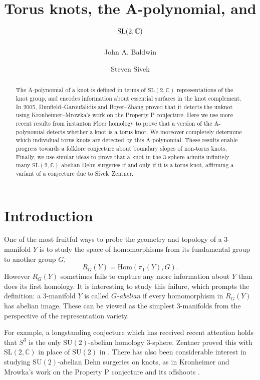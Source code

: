 \documentclass[11pt]{amsart}
\title{Torus knots, the A-polynomial, and $\SL(2,\C)$}
\author[John A. Baldwin]{John A. Baldwin}
\author[Steven Sivek]{Steven Sivek}
\numberwithin{equation}{section}
\numberwithin{theorem}{section}
\theoremstyle{definition}
\newcommand{\C}{\mathbb{C}}
\newcommand\SU{\mathrm{SU}}
\newcommand\SL{\mathrm{SL}}
\begin{document}

\begin{abstract}
The A-polynomial of a knot is defined in terms of $\SL(2,\C)$ representations of the knot group, and encodes information about essential surfaces in the knot complement. In 2005, Dunfield--Garoufalidis and Boyer--Zhang proved that it detects the unknot using Kronheimer--Mrowka's work on the Property P conjecture. Here we use more recent results from instanton Floer homology to prove that a version of the A-polynomial detects whether a knot is a torus knot. We moreover completely determine which individual torus knots are detected by this A-polynomial.  These results enable progress towards a folklore conjecture about boundary slopes of non-torus knots.  Finally, we use similar ideas to prove that a knot in the 3-sphere admits infinitely many $\SL(2,\C)$-abelian Dehn surgeries if and only if it is a torus knot, affirming a variant of a conjecture due to Sivek--Zentner.
\end{abstract}

\maketitle

\section{Introduction}\label{sec:intro}

One of the most  fruitful ways to  probe the geometry and topology  of a 3-manifold $Y$ is to study the  space of homomorphisms from its fundamental group  to another group $G$, \[R_G(Y) = \mathrm{Hom}(\pi_1(Y),G).\]
However $R_G(Y)$ sometimes fails to capture  any more  information about $Y$ than does its first homology.  It is interesting to study this failure, which prompts the definition: a 3-manifold $Y$ is called \emph{$G$-abelian} if every homomorphism in $R_G(Y)$ has abelian image. These can be viewed as the simplest 3-manifolds from the perspective of the representation variety.

For example, a longstanding conjecture \cite[Problem 3.105]{kirby-list} which has received  recent attention \cite{lpcz,bs-stein} holds that $S^3$ is the only $\SU(2)$-abelian  homology 3-sphere. Zentner proved this  with $\SL(2,\C)$ in place of $\SU(2)$ in \cite{zentner}. There has also been considerable  interest in studying  $\SU(2)$-abelian Dehn surgeries on knots, as in  Kronheimer and Mrowka's work on the Property P conjecture and its offshoots
\cite{km-p,km-su2,bs-lspace,blsy}.
\end{document}
